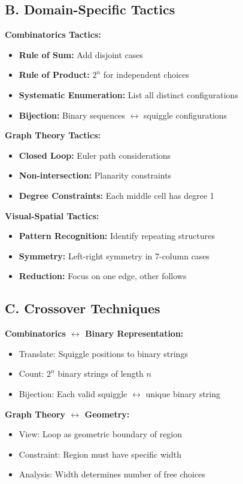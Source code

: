 \documentclass[12pt]{article}
\begin{document}
\begin{tacticalbox}
\subsection*{B. Domain-Specific Tactics}

\textbf{Combinatorics Tactics:}
\begin{itemize}
    \item \textbf{Rule of Sum:} Add disjoint cases
    \item \textbf{Rule of Product:} $2^n$ for independent choices
    \item \textbf{Systematic Enumeration:} List all distinct configurations
    \item \textbf{Bijection:} Binary sequences $\leftrightarrow$ squiggle configurations
\end{itemize}

\textbf{Graph Theory Tactics:}
\begin{itemize}
    \item \textbf{Closed Loop:} Euler path considerations
    \item \textbf{Non-intersection:} Planarity constraints
    \item \textbf{Degree Constraints:} Each middle cell has degree 1
\end{itemize}

\textbf{Visual-Spatial Tactics:}
\begin{itemize}
    \item \textbf{Pattern Recognition:} Identify repeating structures
    \item \textbf{Symmetry:} Left-right symmetry in 7-column cases
    \item \textbf{Reduction:} Focus on one edge, other follows
\end{itemize}

\subsection*{C. Crossover Techniques}

\textbf{Combinatorics $\leftrightarrow$ Binary Representation:}
\begin{itemize}
    \item Translate: Squiggle positions to binary strings
    \item Count: $2^n$ binary strings of length $n$
    \item Bijection: Each valid squiggle $\leftrightarrow$ unique binary string
\end{itemize}

\textbf{Graph Theory $\leftrightarrow$ Geometry:}
\begin{itemize}
    \item View: Loop as geometric boundary of region
    \item Constraint: Region must have specific width
    \item Analysis: Width determines number of free choices
\end{itemize}

\end{tacticalbox}
\end{document}
